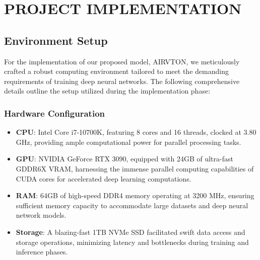 \chapter[Project Implementation]{PROJECT IMPLEMENTATION}

\section{Environment Setup}

For the implementation of our proposed model, AIRVTON, we meticulously crafted a robust computing environment tailored to meet the demanding requirements of training deep neural networks. The following comprehensive details outline the setup utilized during the implementation phase:

\subsection{Hardware Configuration}
\begin{itemize}
  \item \textbf{CPU}: Intel Core i7-10700K, featuring 8 cores and 16 threads, clocked at 3.80 GHz, providing ample computational power for parallel processing tasks.
  \item \textbf{GPU}: NVIDIA GeForce RTX 3090, equipped with 24GB of ultra-fast GDDR6X VRAM, harnessing the immense parallel computing capabilities of CUDA cores for accelerated deep learning computations.
  \item \textbf{RAM}: 64GB of high-speed DDR4 memory operating at 3200 MHz, ensuring sufficient memory capacity to accommodate large datasets and deep neural network models.
  \item \textbf{Storage}: A blazing-fast 1TB NVMe SSD facilitated swift data access and storage operations, minimizing latency and bottlenecks during training and inference phases.
\end{itemize}

